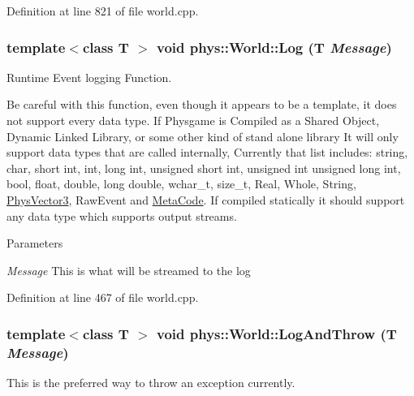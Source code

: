Definition at line 821 of file world.cpp.

\hypertarget{classphys_1_1World_a05267a20e8d5518771d0848190b33d60}{
\subsubsection[{Log}]{\setlength{\rightskip}{0pt plus 5cm}template$<$class T $>$ void phys::World::Log (T {\em Message})}}
\label{da/ddf/classphys_1_1World_a05267a20e8d5518771d0848190b33d60}


Runtime Event logging Function. 

Be careful with this function, even though it appears to be a template, it does not support every data type. If Physgame is Compiled as a Shared Object, Dynamic Linked Library, or some other kind of stand alone library It will only support data types that are called internally, Currently that list includes: string, char, short int, int, long int, unsigned short int, unsigned int unsigned long int, bool, float, double, long double, wchar\_\-t, size\_\-t, Real, Whole, String, \hyperlink{classPhysVector3}{PhysVector3}, RawEvent and \hyperlink{classphys_1_1MetaCode}{MetaCode}. If compiled statically it should support any data type which supports output streams. 
\begin{DoxyParams}{Parameters}
\item[{\em Message}]This is what will be streamed to the log \end{DoxyParams}


Definition at line 467 of file world.cpp.

\hypertarget{classphys_1_1World_a88e6bdee6b972111b6804ca746738c50}{
\subsubsection[{LogAndThrow}]{\setlength{\rightskip}{0pt plus 5cm}template$<$class T $>$ void phys::World::LogAndThrow (T {\em Message})}}
\label{da/ddf/classphys_1_1World_a88e6bdee6b972111b6804ca746738c50}


This is the preferred way to throw an exception currently. 

